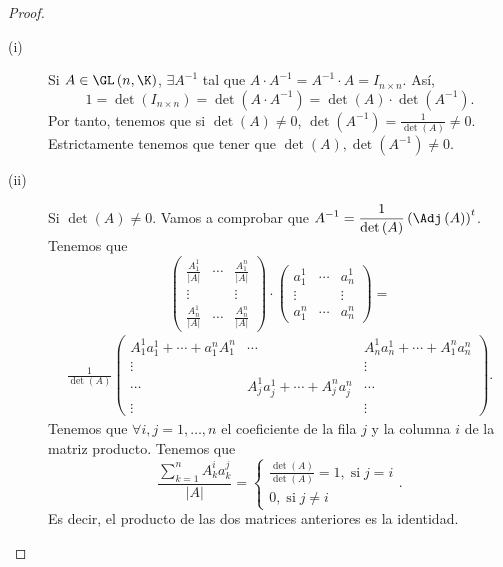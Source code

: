 \begin{proof}
\begin{description}
\item[(i)] Si $\displaystyle A \in \GL\left(n, \K\right) $, $\displaystyle \exists A^{-1} $ tal que $\displaystyle A \cdot A^{-1} = A^{-1} \cdot A = I_{n \times n} $. Así,
	\[1 = \det\left(I_{n \times n}\right) = \det\left(A \cdot A^{-1}\right) = \det\left(A\right) \cdot \det\left(A^{-1}\right) .\]
Por tanto, tenemos que si $\displaystyle \det\left(A\right) \neq 0 $, $\displaystyle \det\left(A^{-1}\right) = \frac{1}{\det\left(A\right)} \neq 0 $. Estrictamente tenemos que tener que $\displaystyle \det\left(A\right), \det\left(A^{-1}\right) \neq 0 $.
\item[(ii)] Si $\displaystyle \det\left(A\right) \neq 0 $. Vamos a comprobar que $\displaystyle A^{-1} = \frac{1}{\det\left(A\right)}\left(\Adj\left(A\right)\right)^{t} $. Tenemos que 
\[ 	\begin{pmatrix} \frac{A^{1}_{1}}{ \left|A\right|} & \cdots & \frac{A^{n}_{1}}{ \left|A\right|} \\
	\vdots & & \vdots \\
	\frac{A^{1}_{n}}{ \left|A\right|} & \cdots & \frac{A^{n}_{n}}{ \left|A\right|}\end{pmatrix} \cdot \begin{pmatrix} a^{1}_{1} & \cdots & a^{1}_{n} \\
\vdots & & \vdots \\
a^{n}_{1} & \cdots & a^{n}_{n}\end{pmatrix} =\]
	\[
\begin{split}
		\frac{1}{\det\left(A\right)}\begin{pmatrix} A^{1}_{1}a^{1}_{1} + \cdots + a^{n}_{1}A^{n}_{1} & \cdots & A^{1}_{n}a^{1}_{n} + \cdots + A^{n}_{1}a^{n}_{n}\\
\vdots & & \vdots \\
\cdots & A^{1}_{j}a^{1}_{j} + \cdots + A^{n}_{j}a^{n}_{j} & \cdots \\
\vdots & & \vdots\end{pmatrix}
.
\end{split}
\]
Tenemos que $\displaystyle \forall i,j = 1, \ldots, n $ el coeficiente de la fila $\displaystyle j $ y la columna $\displaystyle i $ de la matriz producto. Tenemos que
\[\frac{\sum^{n}_{k=1}A^{i}_{k}a^{j}_{k}}{ \left|A\right|} = 
\begin{cases}
\frac{\det\left(A\right)}{\det\left(A\right)} = 1, \; \text{si} \; j =i \\
0, \; \text{si} \; j \neq i
\end{cases}
.\]
Es decir, el producto de las dos matrices anteriores es la identidad.
\end{description}
\end{proof}

